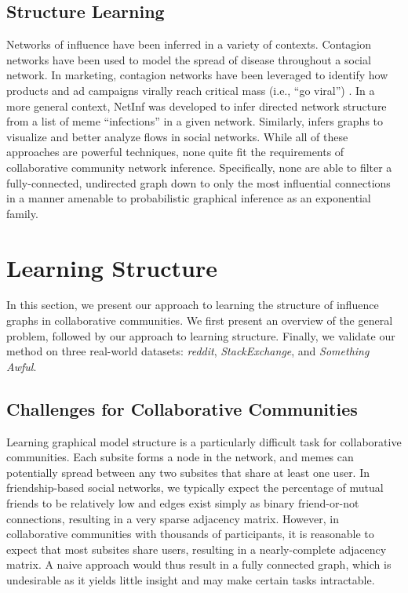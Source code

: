 \documentclass{article} %
\begin{document}
\subsection{Structure Learning}
Networks of influence have been inferred in a variety of contexts. Contagion networks have been used \cite{contagion} to model the spread of disease throughout a social network. In marketing, contagion networks have been leveraged to identify how products and ad campaigns virally reach critical mass (i.e., ``go viral'') \cite{marketing1, marketing2}. In a more general context, NetInf \cite{netinf} was developed to infer directed network structure from a list of meme ``infections'' in a given network. Similarly, \cite{measuresocial} infers graphs to visualize and better analyze flows in social networks. While all of these approaches are powerful techniques, none quite fit the requirements of collaborative community network inference. Specifically, none are able to filter a fully-connected, undirected graph down to only the most influential connections in a manner amenable to probabilistic graphical inference as an exponential family.

\section{Learning Structure}
\label{sec:structure}
In this section, we present our approach to learning the structure of influence graphs in collaborative communities. We first present an overview of the general problem, followed by our approach to learning structure. Finally, we validate our method on three real-world datasets: \textit{reddit}, \textit{StackExchange}, and \textit{Something Awful}.

\subsection{Challenges for Collaborative Communities}
Learning graphical model structure is a particularly difficult task for collaborative communities. Each subsite forms a node in the network, and memes can potentially spread between any two subsites that share at least one user. In friendship-based social networks, we typically expect the percentage of mutual friends to be relatively low and edges exist simply as binary friend-or-not connections, resulting in a very sparse adjacency matrix. However, in collaborative communities with thousands of participants, it is reasonable to expect that most subsites share users, resulting in a nearly-complete adjacency matrix. A naive approach would thus result in a fully connected graph, which is undesirable as it yields little insight and may make certain tasks intractable.
\end{document}
